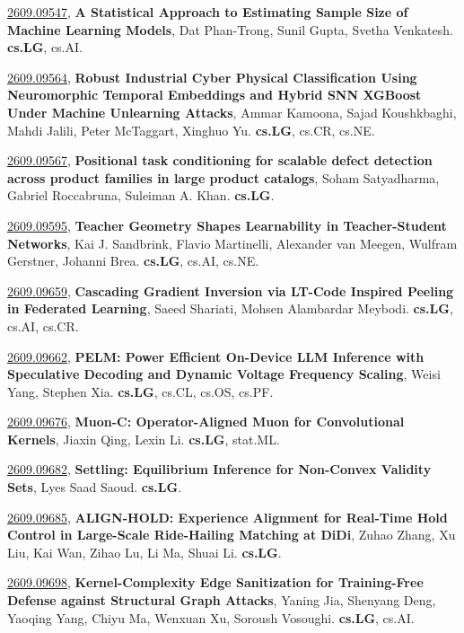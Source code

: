 \documentclass[9pt, a4paper]{article}
\theoremstyle{plain}
\theoremstyle{definition}
\theoremstyle{remark}
\newcommand{\arxivwithtarget}[3]{\hypertarget{#1}{}\href{https://arxiv.org/abs/#1}{#1}, \textbf{\textcolor{arxivblue}{#2}}, #3. }
\begin{document}
\arxivwithtarget{2609.09547}{A Statistical Approach to Estimating Sample Size of Machine Learning Models}{Dat Phan-Trong, Sunil Gupta, Svetha Venkatesh}\textbf{cs.LG}, cs.AI.



\arxivwithtarget{2609.09564}{Robust Industrial Cyber Physical Classification Using Neuromorphic Temporal Embeddings and Hybrid SNN XGBoost Under Machine Unlearning Attacks}{Ammar Kamoona, Sajad Koushkbaghi, Mahdi Jalili, Peter McTaggart, Xinghuo Yu}\textbf{cs.LG}, cs.CR, cs.NE.



\arxivwithtarget{2609.09567}{Positional task conditioning for scalable defect detection across product families in large product catalogs}{Soham Satyadharma, Gabriel Roccabruna, Suleiman A. Khan}\textbf{cs.LG}.



\arxivwithtarget{2609.09595}{Teacher Geometry Shapes Learnability in Teacher-Student Networks}{Kai J. Sandbrink, Flavio Martinelli, Alexander van Meegen, Wulfram Gerstner, Johanni Brea}\textbf{cs.LG}, cs.AI, cs.NE.



\arxivwithtarget{2609.09659}{Cascading Gradient Inversion via LT-Code Inspired Peeling in Federated Learning}{Saeed Shariati, Mohsen Alambardar Meybodi}\textbf{cs.LG}, cs.AI, cs.CR.



\arxivwithtarget{2609.09662}{PELM: Power Efficient On-Device LLM Inference with Speculative Decoding and Dynamic Voltage Frequency Scaling}{Weisi Yang, Stephen Xia}\textbf{cs.LG}, cs.CL, cs.OS, cs.PF.



\arxivwithtarget{2609.09676}{Muon-C: Operator-Aligned Muon for Convolutional Kernels}{Jiaxin Qing, Lexin Li}\textbf{cs.LG}, stat.ML.



\arxivwithtarget{2609.09682}{Settling: Equilibrium Inference for Non-Convex Validity Sets}{Lyes Saad Saoud}\textbf{cs.LG}.



\arxivwithtarget{2609.09685}{ALIGN-HOLD: Experience Alignment for Real-Time Hold Control in Large-Scale Ride-Hailing Matching at DiDi}{Zuhao Zhang, Xu Liu, Kai Wan, Zihao Lu, Li Ma, Shuai Li}\textbf{cs.LG}.



\arxivwithtarget{2609.09698}{Kernel-Complexity Edge Sanitization for Training-Free Defense against Structural Graph Attacks}{Yaning Jia, Shenyang Deng, Yaoqing Yang, Chiyu Ma, Wenxuan Xu, Soroush Vosoughi}\textbf{cs.LG}, cs.AI.
\end{document}
